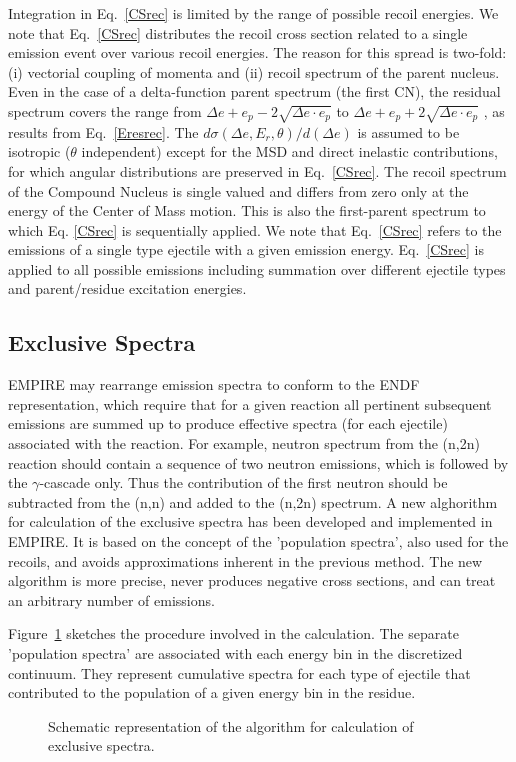 Integration in Eq.~\ref{CSrec} is limited by the range of possible recoil
energies. We note that Eq.~\ref{CSrec} distributes the recoil cross section
related to a single emission event over various recoil energies. The reason
for this spread is two-fold: (i) vectorial coupling of momenta and (ii)
recoil spectrum of the parent nucleus. Even in the case of a delta-function
parent spectrum (the first CN), the residual spectrum covers the range from $%
\Delta e+e_{p}-2\sqrt{\Delta e\cdot e_{p}}$ to $\Delta e+e_{p}+2\sqrt{\Delta
e\cdot e_{p}}$ , as results from Eq.~\ref{Eresrec}. The $d\sigma(\Delta
e,E_{r},\theta)/d(\Delta e)$ is assumed to be isotropic ($\theta$
independent) except for the MSD%
 and direct inelastic contributions, for which angular
distributions are preserved in Eq.~\ref{CSrec}. The recoil spectrum of the
Compound Nucleus is single valued and differs from zero only at the energy
of the Center of Mass motion. This is also the first-parent spectrum to
which Eq. \ref{CSrec} is sequentially applied. We note that Eq.~\ref{CSrec}
refers to the emissions of a single type ejectile with a given emission
energy. Eq.~\ref{CSrec} is applied to all possible emissions including
summation over different ejectile types and parent/residue excitation
energies.

\subsection{Exclusive Spectra}

EMPIRE may rearrange emission spectra to conform to the ENDF representation,
which require that for a given reaction all pertinent subsequent emissions
are summed up to produce effective spectra (for each ejectile) associated
with the reaction. For example, neutron spectrum from the (n,2n) reaction
should contain a sequence of two neutron emissions, which is followed by the
$\gamma$-cascade only. Thus the contribution of the first neutron should be
subtracted from the (n,n) and added to the (n,2n) spectrum. A new alghorithm
for calculation of the exclusive spectra has been developed and implemented
in EMPIRE. It is based on the concept of the 'population spectra', also used
for the recoils, and avoids approximations inherent in the previous method.
The new algorithm is more precise, never produces negative cross sections,
and can treat an arbitrary number of emissions.

Figure~\ref{exclusive} sketches the procedure involved in the calculation.
The separate 'population spectra' are associated with each energy bin in the
discretized continuum. They represent cumulative spectra for each type of
ejectile that contributed to the population of a given energy bin in the
residue.
\begin{figure}[htbp]
\caption{Schematic representation of the algorithm for calculation of
exclusive spectra.}
\label{exclusive}
\end{figure}

